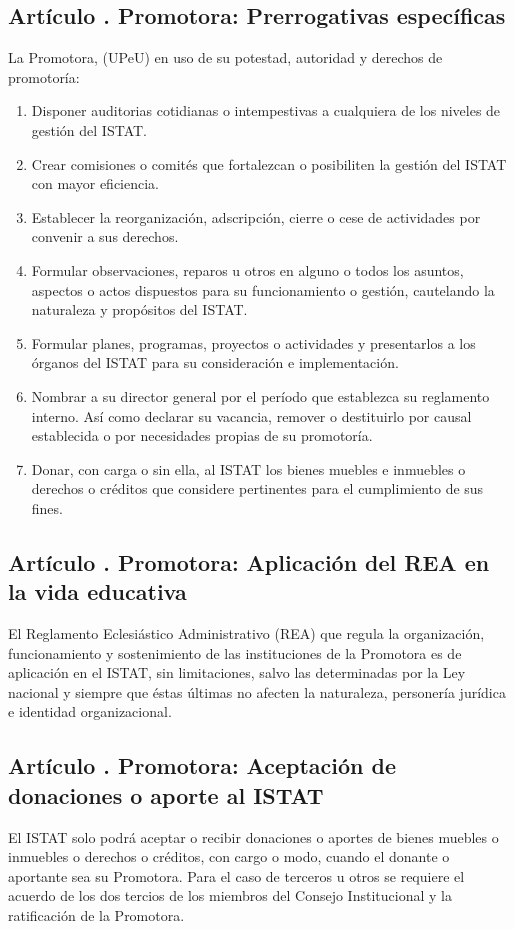 \subsection{Artículo . Promotora: Prerrogativas específicas}
\addtocounter{ns}{1}
La Promotora, (UPeU) en uso de su potestad, autoridad y derechos de promotoría:
\begin{enumerate}
\item Disponer auditorias cotidianas o intempestivas a cualquiera de los niveles de gestión del ISTAT.
\item Crear comisiones o comités que fortalezcan o posibiliten la gestión del ISTAT con mayor eficiencia.
\item Establecer la reorganización, adscripción, cierre o cese de actividades por convenir a sus derechos.
\item Formular observaciones, reparos u otros en alguno o todos los asuntos, aspectos o actos dispuestos para su funcionamiento o gestión, cautelando la naturaleza y propósitos del ISTAT.
\item Formular planes, programas, proyectos o actividades y presentarlos a los órganos del ISTAT para su consideración e implementación.
\item Nombrar a su director general por el período que establezca su reglamento interno. Así como declarar su vacancia, remover o destituirlo por causal establecida o por necesidades propias de su promotoría.
\item Donar, con carga o sin ella, al ISTAT los bienes muebles e inmuebles o derechos o créditos que considere pertinentes para el cumplimiento de sus fines.
\end{enumerate}
\subsection{Artículo . Promotora: Aplicación del REA en la vida educativa}
\addtocounter{ns}{1}
El Reglamento Eclesiástico Administrativo (REA) que regula la organización, funcionamiento y sostenimiento de las instituciones de la Promotora es de aplicación en el ISTAT, sin limitaciones, salvo las determinadas por la Ley nacional y siempre que éstas últimas no afecten la naturaleza, personería jurídica e identidad organizacional. 
\subsection{Artículo . Promotora: Aceptación de donaciones o aporte al ISTAT}
\addtocounter{ns}{1}
El ISTAT solo podrá aceptar o recibir donaciones o aportes de bienes muebles o inmuebles o derechos o créditos, con cargo o modo, cuando el donante o aportante sea su Promotora. Para el caso de terceros u otros se requiere el acuerdo de los dos tercios de los miembros del Consejo Institucional y la ratificación de la Promotora. 

